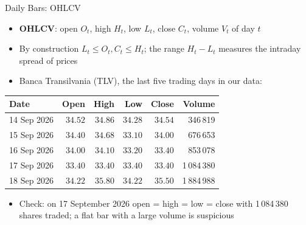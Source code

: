 \begin{frame}{Daily Bars: OHLCV}
\itemsize{\footnotesize}
\begin{itemize}
    \item \textbf{OHLCV}: open $O_t$, high $H_t$, low $L_t$, close $C_t$, volume $V_t$ of day $t$
    \item By construction $L_t \le O_t, C_t \le H_t$; the range $H_t - L_t$ measures the intraday spread of prices
    \item Banca Transilvania (TLV), the last five trading days in our data:
\end{itemize}\begin{center}
\footnotesize
\begin{tabular}{lrrrrr}
\toprule
Date & Open & High & Low & Close & Volume \\
\midrule
14 Sep 2026 & $34.52$ & $34.86$ & $34.28$ & $34.54$ & 346\,819 \\
15 Sep 2026 & $34.40$ & $34.68$ & $33.10$ & $34.00$ & 676\,653 \\
16 Sep 2026 & $34.00$ & $34.10$ & $33.20$ & $33.40$ & 853\,078 \\
17 Sep 2026 & $33.40$ & $33.40$ & $33.40$ & $33.40$ & 1\,084\,380 \\
18 Sep 2026 & $34.22$ & $35.80$ & $34.22$ & $35.50$ & 1\,884\,988 \\
\bottomrule
\end{tabular}
\end{center}
\begin{itemize}
    \item Check: on 17 September 2026 open = high = low = close with 1\,084\,380 shares traded; a flat bar with a large volume is suspicious
\end{itemize}
\end{frame}

